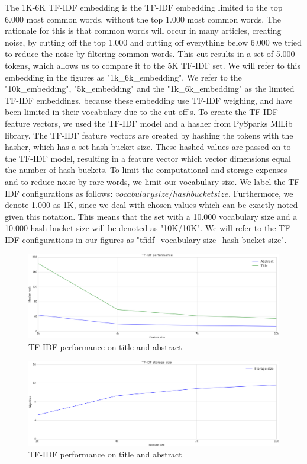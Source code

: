 \documentclass[../../Thesis.tex]{subfiles}
\begin{document}
The 1K-6K TF-IDF embedding is the TF-IDF embedding limited to the top 6.000 most common words, without the top 1.000 most common words. The rationale for this is that common words will occur in many articles, creating noise, by cutting off the top 1.000 and cutting off everything below 6.000 we tried to reduce the noise by filtering common words. This cut results in a set of 5.000 tokens, which allows us to compare it to the 5K TF-IDF set. We will refer to this embedding in the figures as "1k\_6k\_embedding". We refer to the "10k\_embedding", "5k\_embedding" and the "1k\_6k\_embedding" as the limited TF-IDF embeddings, because these embedding use TF-IDF weighing, and have been limited in their vocabulary due to the cut-off's.
\clearpage
{}
To create the TF-IDF feature vectors, we used the TF-IDF model and a hasher from PySparks MlLib library. The TF-IDF feature vectors are created by hashing the tokens with the hasher, which has a set hash bucket size. These hashed values are passed on to the TF-IDF model, resulting in a feature vector which vector dimensions equal the number of hash buckets. To limit the computational and storage expenses and to reduce noise by rare words, we limit our vocabulary size.
We label the TF-IDF configurations as follows: $vocabulary size/hash bucket size$. Furthermore, we denote 1.000 as 1K, since we deal with chosen values which can be exactly noted given this notation. This means that the set with a 10.000 vocabulary size and a 10.000 hash bucket size will be denoted as "10K/10K". We will refer to the TF-IDF configurations in our figures as "tfidf\_vocabulary size\_hash bucket size".
\begin{figure}[hbt]
\includegraphics[width=5in]{Plots/tfidf_selection_plot_performance}
\caption{TF-IDF performance on title and abstract}\label{figure:tfidfPerformance}
\end{figure}
\begin{figure}[hbt]
\includegraphics[width=5in]{Plots/tfidf_selection_plot_memory}
\caption{TF-IDF performance on title and abstract}\label{figure:tfidfMemory}
\end{figure}
\end{document}
